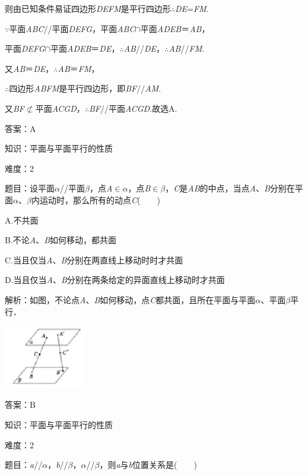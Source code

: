 \documentclass{article} %
\begin{document}
则由已知条件易证四边形\textit{DEFM}是平行四边形$\mathrm{\therefore}$\textit{DE}=\textit{FM}.

$\mathrm{\because}$平面\textit{ABC}//平面\textit{DEFG}，平面\textit{ABC}$\mathrm{\cap}$平面\textit{ADEB}＝\textit{AB}，

平面\textit{DEFG}$\mathrm{\cap}$平面\textit{ADEB}＝\textit{DE}，$\mathrm{\therefore}$\textit{AB}//\textit{DE}，$\mathrm{\therefore}$\textit{AB}//\textit{FM}.

又\textit{AB}＝\textit{DE}，$\mathrm{\therefore}$\textit{AB}＝\textit{FM}，

$\mathrm{\therefore}$四边形\textit{ABFM}是平行四边形，即\textit{BF}//\textit{AM}.

又\textit{BF}$\mathrm{\nsubset}$平面\textit{ACGD}，$\mathrm{\therefore}$\textit{BF}//平面\textit{ACGD}.故选A.

答案：A

知识：平面与平面平行的性质

难度：2

题目：设平面\textit{$\alpha$}//平面\textit{$\beta$}，点\textit{A}$\mathrm{\in}$\textit{$\alpha$}，点\textit{B}$\mathrm{\in}$\textit{$\beta$}，\textit{C}是\textit{AB}的中点，当点\textit{A}、\textit{B}分别在平面\textit{$\alpha$}、\textit{$\beta$}内运动时，那么所有的动点\textit{C}(　　)

A.不共面

B.不论\textit{A}、\textit{B}如何移动，都共面

C.当且仅当\textit{A}、\textit{B}分别在两直线上移动时时才共面

D.当且仅当\textit{A}、\textit{B}分别在两条给定的异面直线上移动时才共面

解析：如图，不论点\textit{A}、\textit{B}如何移动，点\textit{C}都共面，且所在平面与平面\textit{$\alpha$}、平面\textit{$\beta$}平行．

\includegraphics*[width=1.43in, height=1.09in, keepaspectratio=false]{image186}

答案：B

知识：平面与平面平行的性质

难度：2

题目：\textit{a}//\textit{$\alpha$}，\textit{b}//\textit{$\beta$}，\textit{$\alpha$}//\textit{$\beta$}，则\textit{a}与\textit{b}位置关系是(　　)
\end{document}
